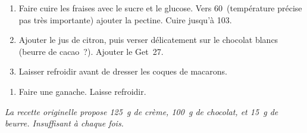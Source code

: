 \begin{recipe}
  \begin{enumerate}

  \item Faire cuire les fraises avec le sucre et le glucose.  Vers
    60\degreeC\ (temp\'erature pr\'ecise pas tr\`es importante) ajouter la
    pectine.  Cuire jusqu'\`a 103\degreeC.

  \item Ajouter le jus de citron, puis verser d\'elicatement sur le
    chocolat blancs (beurre de cacao~?).  Ajouter le Get~27.

  \item Laisser refroidir avant de dresser les coques de macarons.
  \end{enumerate}  
\end{recipe}



\begin{ingredients}
\end{ingredients}


\begin{recipe}
  \begin{enumerate}

  \item Faire une ganache.  Laisse  refroidir.

  \end{enumerate}
\end{recipe}

{\it La recette originelle propose 125~g de crème, 100~g de chocolat,
  et 15~g de beurre.  Insuffisant à chaque fois.}

